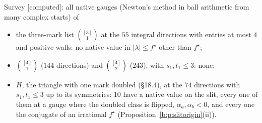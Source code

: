 \documentclass[11pt]{article}
\theoremstyle{plain}
\theoremstyle{definition}
\theoremstyle{remark}
\newcommand{\computed}{\textup{[computed]}}
\begin{document}
\noindent Survey \computed: all native gauges (Newton's method in ball arithmetic from many complex starts) of
\begin{itemize}
\item the three-mark list $\binom{[3]}1$ at the $55$ integral directions with entries at most $4$ and positive walls: no native value in $|\lambda|\le f^\star$ other than $f^\star$;
\item $\binom{[4]}1$ ($144$ directions) and $\binom{[4]}2$ ($243$), with $s_1,t_1\le3$: none;
\item $H$, the triangle with one mark doubled (\S18.4), at the $74$ directions with $s_1,t_1\le3$ up to its symmetries: $10$ have a native value on the slit, every one of them at a gauge where the doubled class is flipped, $\alpha_a,\alpha_b<0$, and every one the conjugate of an irrational $f^\star$ (Proposition~\ref{b:p:slitorigin}(ii)).
\end{itemize}
\end{document}
